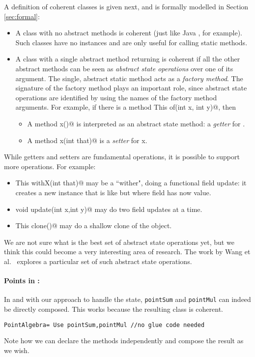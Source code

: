 A definition of coherent
classes is given next, and is formally modelled in Section \ref{sec:formal}:
\begin{itemize}
\item A class with no abstract methods is coherent (just like Java
  \Q@Math@, for example). Such classes have no instances and are only useful for calling static methods.
\item A class with a single abstract \Q@static@ method returning \Q@This@
is coherent if all the other abstract methods can be seen as \emph{abstract state
operations} over one of its argument. The single, abstract static
method acts as a \emph{factory method}.
The signature of the factory method plays an important role, since
abstract state operations are identified by using the names of the
factory method arguments.
For example,
if there is a \Q@static method This of(int x, int y)@,
then
\begin{itemize}
\item A method \Q@int x()@ is interpreted as an abstract state method: a \emph{getter} for \Q@x@.
\item A method \Q@void x(int that)@ is a \emph{setter} for x.
\end{itemize}
\end{itemize}
\noindent
While getters and setters are fundamental operations, it is possible to
support more operations. For example:
\begin{itemize}
\item \Q@method This withX(int that)@
may be a ``wither", doing a functional field update: it creates a new instance that is like \Q@this@ but where field \Q@x@ has now \Q@that@ value.
\item \Q@method void update(int x,int y)@
may do two field updates at a time.
\item\Q@method This clone()@ may do a shallow clone of the object.
\end{itemize}

We are not sure what is the best set of abstract state operations yet,
but we think this could become a very interesting area of research.
The work by Wang et al.~\cite{wang2016classless} explores a particular
set of such abstract state operations.

\paragraph{Points in \name:}
In \name and with our approach to handle the state, 
\lstinline{pointSum} and \lstinline{pointMul} can indeed be directly composed.
This works because the resulting class is coherent.
\saveSpace\saveSpace
\begin{lstlisting}
PointAlgebra= Use pointSum,pointMul //no glue code needed
\end{lstlisting}  
\saveSpace\saveSpace
\noindent
  Note how we can declare the methods independently and compose the result
  as we wish. 

